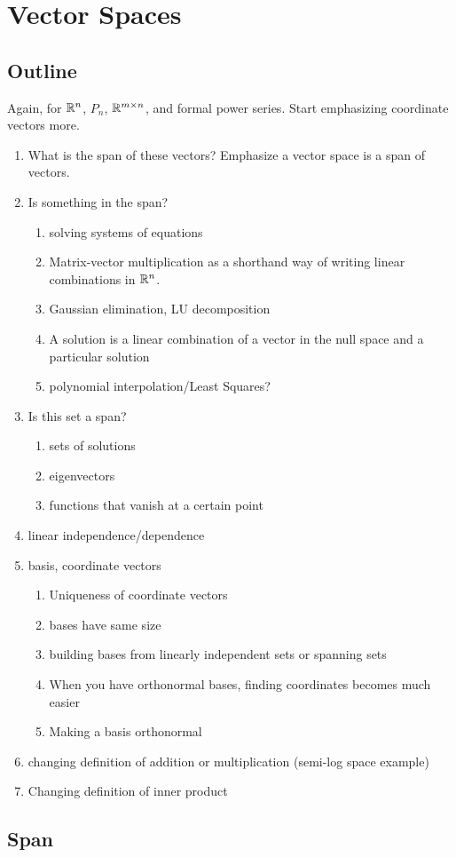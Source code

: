 \chapter{Vector Spaces}
\section{Outline}
Again, for $\mathbb{R}^n$, $P_n$, $\mathbb{R}^{m\times n}$, and formal power
series. Start emphasizing coordinate vectors more.
\begin{enumerate}
\item What is the span of these vectors?  Emphasize a vector space is
  a span of vectors.

\item Is something in the span?
  \begin{enumerate}
  \item solving systems of equations
  \item Matrix-vector multiplication as a shorthand way of writing
    linear combinations in $\mathbb{R}^n$.
  \item Gaussian elimination, LU decomposition
  \item A solution is a linear combination of a vector in the null
    space and a particular solution
  \item polynomial interpolation/Least Squares?
  \end{enumerate}

\item Is this set a span?
  \begin{enumerate}
  \item sets of solutions
  \item eigenvectors
  \item functions that vanish at a certain point
  \end{enumerate}

\item linear independence/dependence

\item basis, coordinate vectors
  \begin{enumerate}
  \item Uniqueness of coordinate vectors
  \item bases have same size
  \item building bases from linearly independent sets or spanning sets
  \item When you have orthonormal bases, finding coordinates becomes
    much easier
  \item Making a basis orthonormal
  \end{enumerate}

\item changing definition of addition or multiplication (semi-log
  space example)
\item Changing definition of inner product

\end{enumerate}

\section{Span}

